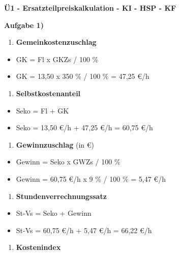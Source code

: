 \textbf{Ü1 - Ersatzteilpreiskalkulation - KI - HSP - KF}

\textbf{Aufgabe 1)}

\begin{enumerate}
\def\labelenumi{\alph{enumi})}
\item
  \textbf{Gemeinkostenzuschlag}
\end{enumerate}

\begin{itemize}
\item
  GK = Fl x GKZs / 100 \%
\item
  GK = 13,50 x 350 \% / 100 \% = 47,25 €/h
\end{itemize}

\begin{enumerate}
\def\labelenumi{\alph{enumi})}
\setcounter{enumi}{1}
\item
  \textbf{Selbstkostenanteil}
\end{enumerate}

\begin{itemize}
\item
  Seko = Fl + GK
\item
  Seko = 13,50 €/h + 47,25 €/h = 60,75 €/h
\end{itemize}

\begin{enumerate}
\def\labelenumi{\alph{enumi})}
\setcounter{enumi}{2}
\item
  \textbf{Gewinnzuschlag} (in €)
\end{enumerate}

\begin{itemize}
\item
  Gewinn = Seko x GWZs / 100 \%
\item
  Gewinn = 60,75 €/h x 9 \% / 100 \% = 5,47 €/h
\end{itemize}

\begin{enumerate}
\def\labelenumi{\alph{enumi})}
\setcounter{enumi}{3}
\item
  \textbf{Stundenverrechnungssatz}
\end{enumerate}

\begin{itemize}
\item
  St-Vs = Seko + Gewinn
\item
  St-Vs = 60,75 €/h + 5,47 €/h = 66,22 €/h
\end{itemize}

\begin{enumerate}
\def\labelenumi{\alph{enumi})}
\setcounter{enumi}{4}
\item
  \textbf{Kostenindex}
\end{enumerate}

